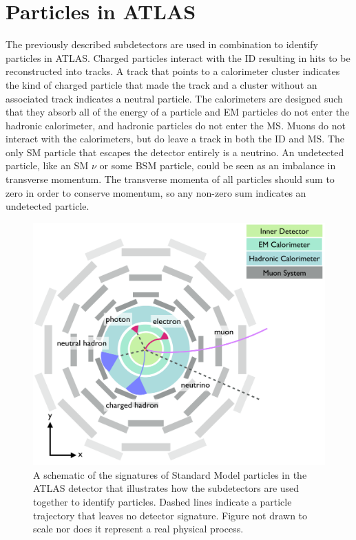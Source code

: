 \section{Particles in ATLAS}
The previously described subdetectors are used in combination to identify particles in \ac{ATLAS}. Charged particles interact with the \ac{ID} resulting in hits to be reconstructed into tracks. A track that points to a calorimeter cluster indicates the kind of charged particle that made the track and a cluster without an associated track indicates a neutral particle. The calorimeters are designed such that they absorb all of the energy of a particle and \ac{EM} particles do not enter the hadronic calorimeter, and hadronic particles do not enter the \ac{MS}. Muons do not interact with the calorimeters, but do leave a track in both the \ac{ID} and \ac{MS}. The only \ac{SM} particle that escapes the detector entirely is a neutrino. An undetected particle, like an \ac{SM} $\nu$ or some \ac{BSM} particle, could be seen as an imbalance in transverse momentum. The transverse momenta of all particles should sum to zero in order to conserve momentum, so any non-zero sum indicates an undetected particle.


\begin{figure}[htbp]
\centering
\includegraphics[width=.8\textwidth]{figures/Detector/particle-doodle.png}
\caption{A schematic of the signatures of Standard Model particles in the \ac{ATLAS} detector that illustrates how the subdetectors are used together to identify particles. Dashed lines indicate a particle trajectory that leaves no detector signature. Figure not drawn to scale nor does it represent a real physical process.}
\label{fig:particle-doodles}
\end{figure}




